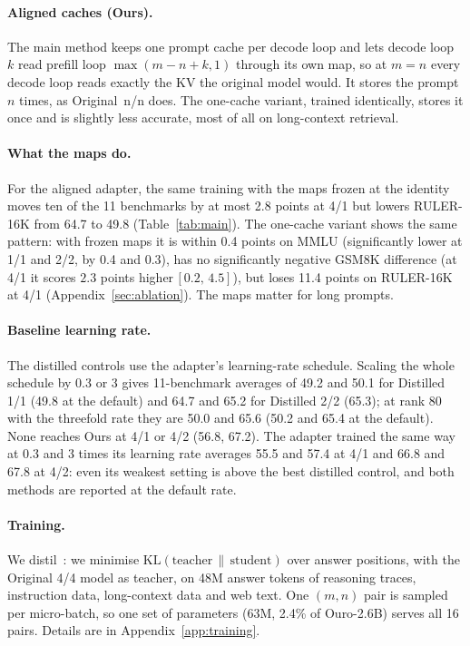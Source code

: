 \documentclass[11pt]{article}
\newcommand{\ci}[2]{\,{\scriptsize\ensuremath{[#1,\,#2]}}}
\newcommand{\nat}[1]{Original~#1/#1}
\begin{document}
\paragraph{Aligned caches (Ours).} The main method keeps one prompt cache per decode loop and lets decode loop $k$ read
prefill loop $\max(m-n+k,1)$ through its own map, so at $m=n$ every decode loop reads exactly the KV the original model
would. It stores the prompt $n$ times, as \nat{n} does. The one-cache variant, trained identically, stores it once and
is slightly less accurate, most of all on long-context retrieval.

\paragraph{What the maps do.} For the aligned adapter, the same training with the maps frozen at the identity moves ten
of the 11 benchmarks by at most 2.8 points at 4/1 but lowers RULER-16K from 64.7 to 49.8 (Table~\ref{tab:main}). The
one-cache variant shows the same pattern: with frozen maps it is within 0.4 points on MMLU (significantly lower at 1/1
and 2/2, by 0.4 and 0.3), has no significantly negative GSM8K difference (at 4/1 it scores $2.3$ points
higher\ci{0.2}{4.5}), but loses 11.4 points on RULER-16K at 4/1 (Appendix~\ref{sec:ablation}). The maps matter for
long prompts.

\paragraph{Baseline learning rate.} The distilled controls use the adapter's learning-rate schedule. Scaling the whole
schedule by 0.3 or 3 gives 11-benchmark averages of 49.2 and 50.1 for Distilled 1/1 (49.8 at the default) and 64.7
and 65.2 for Distilled 2/2 (65.3); at rank 80 with the threefold rate they are 50.0 and 65.6 (50.2 and 65.4 at the
default). None reaches Ours at 4/1 or 4/2 (56.8, 67.2). The adapter trained the same way at 0.3 and 3 times its
learning rate averages 55.5 and 57.4 at 4/1 and 66.8 and 67.8 at 4/2: even its weakest setting is above the best
distilled control, and both methods are reported at the default rate.

\paragraph{Training.} We distil~\citep{kd}: we minimise $\mathrm{KL}(\text{teacher}\,\|\,\text{student})$ over answer positions, with the
Original 4/4 model as teacher, on 48M answer tokens of reasoning traces, instruction data, long-context data and web text.
One $(m,n)$ pair is sampled per micro-batch, so one set of parameters (63M, 2.4\% of Ouro-2.6B) serves all 16 pairs.
Details are in Appendix~\ref{app:training}.
\end{document}
